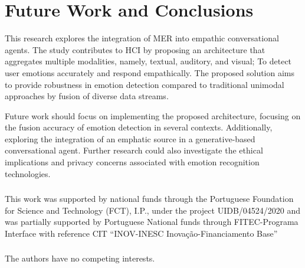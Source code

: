 \documentclass[runningheads]{llncs}
\begin{document}

\section{Future Work and Conclusions}
\label{sec:conclusions}
This research explores the integration of MER into empathic conversational agents. The study contributes to HCI by proposing an architecture that aggregates multiple modalities, namely, textual, auditory, and visual; To detect user emotions accurately and respond empathically. The proposed solution aims to provide robustness in emotion detection compared to traditional unimodal approaches by fusion of diverse data streams.

Future work should focus on implementing the proposed architecture, focusing on the fusion accuracy of emotion detection in several contexts. Additionally, exploring the integration of an emphatic source in a generative-based conversational agent. Further research could also investigate the ethical implications and privacy concerns associated with emotion recognition technologies.

\begin{credits}
\subsubsection{\ackname} This work was supported by national funds through the Portuguese Foundation for Science and Technology (FCT), I.P., under the project UIDB/04524/2020 and was partially supported by Portuguese National funds through FITEC-Programa Interface with reference CIT “INOV-INESC Inovação-Financiamento Base”

\subsubsection{\discintname}
The authors have no competing interests.
\end{credits}
%
%
%


%
\end{document}
